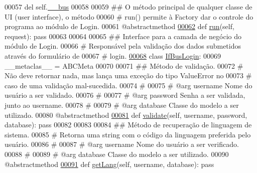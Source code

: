 \begin{DoxyCode}
00057         del self.\hyperlink{classLogin_1_1LoginUnit_1_1IfUiLogin_a550be8bfdf4cbc495bc966484e867af2}{\_\_bus}
00058 
00059     \textcolor{comment}{## O método principal de qualquer classe de UI (user interface), o método}
00060     \textcolor{comment}{#   run() permite à Factory dar o controle do programa ao módulo de Login.}
00061     @abstractmethod
\hypertarget{LoginUnit_8py_source_l00062}{}\hyperlink{classLogin_1_1LoginUnit_1_1IfUiLogin_a783eccf84b36655d28da48159efd01cb}{00062}     \textcolor{keyword}{def }\hyperlink{classLogin_1_1LoginUnit_1_1IfUiLogin_a783eccf84b36655d28da48159efd01cb}{run}(self, request): \textcolor{keyword}{pass}
00063 
00064 
00065 \textcolor{comment}{## Interface para a camada de negócio do módulo de Login.}
00066 \textcolor{comment}{#   Responsável pela validação dos dados submetidos através do formulário de}
00067 \textcolor{comment}{#   login.}
\hypertarget{LoginUnit_8py_source_l00068}{}\hyperlink{classLogin_1_1LoginUnit_1_1IfBusLogin}{00068} \textcolor{keyword}{class }\hyperlink{classLogin_1_1LoginUnit_1_1IfBusLogin}{IfBusLogin}: 
00069     \_\_metaclas\_\_ = ABCMeta
00070 
00071     \textcolor{comment}{## Método de validação.}
00072     \textcolor{comment}{#   Não deve retornar nada, mas lança uma exceção do tipo ValueError no}
00073     \textcolor{comment}{#   caso de uma validação mal-sucedida.}
00074     \textcolor{comment}{#}
00075     \textcolor{comment}{#   @arg username   Nome do usuário a ser validado.}
00076     \textcolor{comment}{#}
00077     \textcolor{comment}{#   @arg password   Senha a ser validada, junto ao username.}
00078     \textcolor{comment}{#}
00079     \textcolor{comment}{#   @arg database   Classe do modelo a ser utilizado.}
00080     @abstractmethod
\hypertarget{LoginUnit_8py_source_l00081}{}\hyperlink{classLogin_1_1LoginUnit_1_1IfBusLogin_a6945b614a0b0f5ee03c61bcd3982c821}{00081}     \textcolor{keyword}{def }\hyperlink{classLogin_1_1LoginUnit_1_1IfBusLogin_a6945b614a0b0f5ee03c61bcd3982c821}{validate}(self, username, password, database): \textcolor{keyword}{pass}
00082 
00083 
00084     \textcolor{comment}{## Método de recuperação de linguagem de sistema.}
00085     \textcolor{comment}{#   Retorna uma string com o código da linguagem preferida pelo usuário.}
00086     \textcolor{comment}{#}
00087     \textcolor{comment}{#   @arg username   Nome do usuário a ser verificado.}
00088     \textcolor{comment}{#}
00089     \textcolor{comment}{#   @arg database   Classe do modelo a ser utilizado.}
00090     @abstractmethod
\hypertarget{LoginUnit_8py_source_l00091}{}\hyperlink{classLogin_1_1LoginUnit_1_1IfBusLogin_a16592b98a3bf9ab48147eed8b6657874}{00091}     \textcolor{keyword}{def }\hyperlink{classLogin_1_1LoginUnit_1_1IfBusLogin_a16592b98a3bf9ab48147eed8b6657874}{getLang}(self, username, database): \textcolor{keyword}{pass}

\end{DoxyCode}

